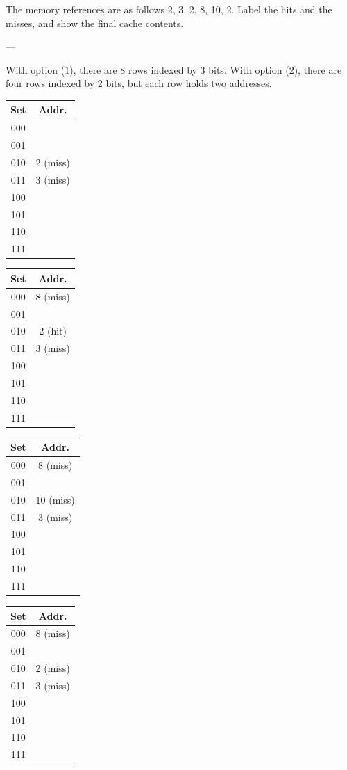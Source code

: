 \documentclass{article}
\begin{document}
The memory references are as follows 2, 3, 2, 8, 10, 2. Label the hits and the misses, and show the final cache contents. 

--- 

With option (1), there are 8 rows indexed by 3 bits. With option (2), there are four rows indexed by 2 bits, but each row holds two addresses. 

\begin{table}[H]
\scriptsize
\begin{tabular}{cc}
\toprule
\textbf{Set} & \textbf{Addr.} \\
\midrule
000 & \\
001 & \\
010 & 2 (miss) \\
011 & 3 (miss) \\
100 & \\
101 & \\
110 & \\
111 & \\
\toprule
\end{tabular}
\quad
\begin{tabular}{cc}
\toprule
\textbf{Set} & \textbf{Addr.} \\
\midrule
000 & 8 (miss) \\
001 & \\
010 & 2 (hit) \\
011 & 3 (miss) \\
100 & \\
101 & \\
110 & \\
111 & \\
\toprule
\end{tabular}
\quad
\begin{tabular}{cc}
\toprule
\textbf{Set} & \textbf{Addr.} \\
\midrule
000 & 8 (miss) \\
001 & \\
010 & 10 (miss) \\
011 & 3 (miss) \\
100 & \\
101 & \\
110 & \\
111 & \\
\toprule
\end{tabular}
\quad
\begin{tabular}{cc}
\toprule
\textbf{Set} & \textbf{Addr.} \\
\midrule
000 & 8 (miss) \\
001 & \\
010 & 2 (miss) \\
011 & 3 (miss) \\
100 & \\
101 & \\
110 & \\
111 & \\
\toprule
\end{tabular}
\end{table}
\end{document}
